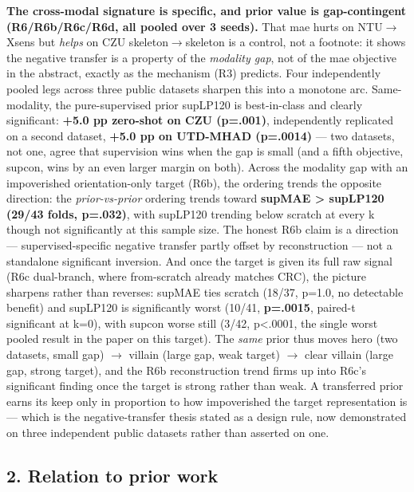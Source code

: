\textbf{The cross-modal signature is specific, and prior value is gap-contingent (R6/R6b/R6c/R6d, all pooled over 3 seeds).} That mae hurts on NTU$\rightarrow$Xsens but \textit{helps} on CZU skeleton$\rightarrow$skeleton is a control, not a footnote: it shows the negative transfer is a property of the \textit{modality gap}, not of the mae objective in the abstract, exactly as the mechanism (R3) predicts. Four independently pooled legs across three public datasets sharpen this into a monotone arc. Same-modality, the pure-supervised prior supLP120 is best-in-class and clearly significant: \textbf{+5.0 pp zero-shot on CZU (p=.001)}, independently replicated on a second dataset, \textbf{+5.0 pp on UTD-MHAD (p=.0014)} --- two datasets, not one, agree that supervision wins when the gap is small (and a fifth objective, supcon, wins by an even larger margin on both). Across the modality gap with an impoverished orientation-only target (R6b), the ordering trends the opposite direction: the \textit{prior-vs-prior} ordering trends toward \textbf{supMAE > supLP120 (29/43 folds, p=.032)}, with supLP120 trending below scratch at every k though not significantly at this sample size. The honest R6b claim is a direction --- supervised-specific negative transfer partly offset by reconstruction --- not a standalone significant inversion. And once the target is given its full raw signal (R6c dual-branch, where from-scratch already matches CRC), the picture sharpens rather than reverses: supMAE ties scratch (18/37, p=1.0, no detectable benefit) and supLP120 is significantly worst (10/41, \textbf{p=.0015}, paired-t significant at k=0), with supcon worse still (3/42, p<.0001, the single worst pooled result in the paper on this target). The \textit{same} prior thus moves hero (two datasets, small gap) $\rightarrow$ villain (large gap, weak target) $\rightarrow$ clear villain (large gap, strong target), and the R6b reconstruction trend firms up into R6c's significant finding once the target is strong rather than weak. A transferred prior earns its keep only in proportion to how impoverished the target representation is --- which is the negative-transfer thesis stated as a design rule, now demonstrated on three independent public datasets rather than asserted on one.

\subsection{2. Relation to prior work}


